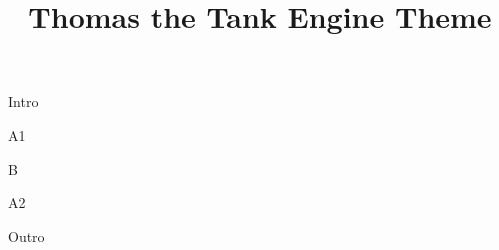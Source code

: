 \documentclass[timestamp]{jazzgrid}
\title{Thomas the Tank Engine Theme}
\begin{document}
\maketitle

\begin{musicsection}{Intro}
	{}
	{\barfour{}{}{}{}{}}
\end{musicsection}

\begin{musicsection}{A1}
\barline
	{}
	{}
	{}
	{}
\barline
	{}
	{}
	{}
	{}
\end{musicsection}

\begin{musicsection}{B}
\barline
	{}
	{}
	{}
	{}
	{}
	{}
	{}
\barline
	{}
	{}
	{}
	{}
\end{musicsection}

\begin{musicsection}{A2}
\barline
	{}
	{}
	{}
	{}
\barline
	{}
	{}
	{}
	{}
\end{musicsection}

\begin{musicsection}{Outro}
	{}
	{}
\end{musicsection}

\begin{multicols*}{2}
	\begin{description}[noitemsep,align=right,labelwidth=\widthof{\bfseries{\scriptsize Outro}}]
	\scriptsize
	\item [Intro]
	\item [A1]
	\item [B]
	\item [A2]
	\item [Outro]
\end{description}
\vfill\null
\columnbreak
\end{multicols*}
\end{document}
